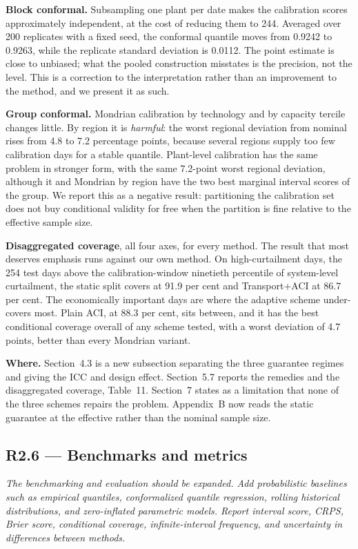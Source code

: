 \documentclass[11pt,a4paper]{article}
\newenvironment{revcomment}
  {\begin{mdframed}[backgroundcolor=quotebg,linecolor=quoterule,linewidth=0.4pt,
    innertopmargin=6pt,innerbottommargin=6pt,skipabove=8pt,skipbelow=8pt]\itshape}
  {\end{mdframed}}
\newcommand{\where}[1]{\textbf{Where.} #1}
\begin{document}
\textbf{Block conformal.} Subsampling one plant per date makes the calibration scores approximately independent, at the cost of reducing them to 244. Averaged over 200 replicates with a fixed seed, the conformal quantile moves from 0.9242 to 0.9263, while the replicate standard deviation is 0.0112. The point estimate is close to unbiased; what the pooled construction misstates is the precision, not the level. This is a correction to the interpretation rather than an improvement to the method, and we present it as such.

\textbf{Group conformal.} Mondrian calibration by technology and by capacity tercile changes little. By region it is \emph{harmful}: the worst regional deviation from nominal rises from 4.8 to 7.2 percentage points, because several regions supply too few calibration days for a stable quantile. Plant-level calibration has the same problem in stronger form, with the same 7.2-point worst regional deviation, although it and Mondrian by region have the two best marginal interval scores of the group. We report this as a negative result: partitioning the calibration set does not buy conditional validity for free when the partition is fine relative to the effective sample size.

\textbf{Disaggregated coverage}, all four axes, for every method. The result that most deserves emphasis runs against our own method. On high-curtailment days, the 254 test days above the calibration-window ninetieth percentile of system-level curtailment, the static split covers at 91.9 per cent and Transport+ACI at 86.7 per cent. The economically important days are where the adaptive scheme under-covers most. Plain ACI, at 88.3 per cent, sits between, and it has the best conditional coverage overall of any scheme tested, with a worst deviation of 4.7 points, better than every Mondrian variant.

\where{Section~4.3 is a new subsection separating the three guarantee regimes and giving the ICC and design effect. Section~5.7 reports the remedies and the disaggregated coverage, Table~11. Section~7 states as a limitation that none of the three schemes repairs the problem. Appendix~B now reads the static guarantee at the effective rather than the nominal sample size.}

\subsection*{R2.6 --- Benchmarks and metrics}

\begin{revcomment}
The benchmarking and evaluation should be expanded. Add probabilistic baselines such as empirical quantiles, conformalized quantile regression, rolling historical distributions, and zero-inflated parametric models. Report interval score, CRPS, Brier score, conditional coverage, infinite-interval frequency, and uncertainty in differences between methods.
\end{revcomment}
\end{document}
